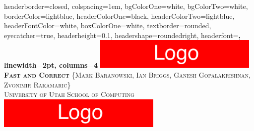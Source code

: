 \documentclass[landscape,a0paper,fontscale=0.32]{baposter} %
\begin{document}
\begin{poster}
{
headerborder=closed, %
colspacing=1em, %
bgColorOne=white, %
bgColorTwo=white, %
borderColor=lightblue, %
headerColorOne=black, %
headerColorTwo=lightblue, %
headerFontColor=white, %
boxColorOne=white, %
textborder=rounded,
eyecatcher=true, %
headerheight=0.1\textheight, %
headershape=roundedright,
headerfont=\Large\bf\textsc, %
linewidth=2pt, %
columns=4
}
{\includegraphics[height=4em]{left_logo}} %
{\bf\textsc{Fast and Correct}\vspace{0.5em}} %
{\textsc{ {\Large \{Mark Baranowski, Ian Briggs, Ganesh Gopalakrishnan, Zvonimir Rakamaric\}}\\
    \hspace{12pt} University of Utah School of Computing}} %
{\includegraphics[height=4em]{right_logo}} %












\end{poster}
\end{document}
